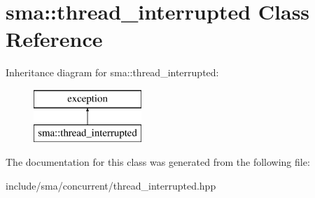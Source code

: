 \hypertarget{classsma_1_1thread__interrupted}{\section{sma\-:\-:thread\-\_\-interrupted Class Reference}
\label{classsma_1_1thread__interrupted}
}
Inheritance diagram for sma\-:\-:thread\-\_\-interrupted\-:\begin{figure}[H]
\begin{center}
\leavevmode
\includegraphics[height=2.000000cm]{classsma_1_1thread__interrupted}
\end{center}
\end{figure}


The documentation for this class was generated from the following file\-:\begin{DoxyCompactItemize}
\item 
include/sma/concurrent/thread\-\_\-interrupted.\-hpp\end{DoxyCompactItemize}

